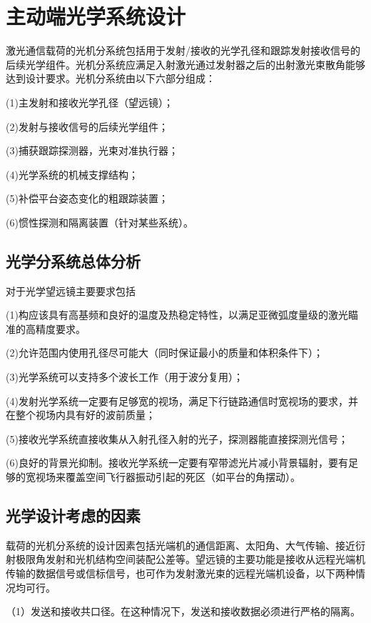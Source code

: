 \chapter{主动端光学系统设计}\label{chap:Lens Design}
激光通信载荷的光机分系统包括用于发射/接收的光学孔径和跟踪发射接收信号的后续光学组件。光机分系统应满足入射激光通过发射器之后的出射激光束散角能够达到设计要求。光机分系统由以下六部分组成：

(1)主发射和接收光学孔径（望远镜）；

(2)发射与接收信号的后续光学组件；

(3)捕获跟踪探测器，光束对准执行器；

(4)光学系统的机械支撑结构；

(5)补偿平台姿态变化的粗跟踪装置；

(6)惯性探测和隔离装置（针对某些系统）。


\section{光学分系统总体分析}
对于光学望远镜主要要求包括

(1)构应该具有高基频和良好的温度及热稳定特性，以满足亚微弧度量级的激光瞄准的高精度要求。

(2)允许范围内使用孔径尽可能大（同时保证最小的质量和体积条件下）；

(3)光学系统可以支持多个波长工作（用于波分复用）；

(4)发射光学系统一定要有足够宽的视场，满足下行链路通信时宽视场的要求，并在整个视场内具有好的波前质量；

(5)接收光学系统直接收集从入射孔径入射的光子，探测器能直接探测光信号；

(6)良好的背景光抑制。接收光学系统一定要有窄带滤光片减小背景辐射，要有足够的宽视场来覆盖空间飞行器振动引起的死区（如平台的角摆动）。
%

\section{光学设计考虑的因素}
载荷的光机分系统的设计因素包括光端机的通信距离、太阳角、大气传输、接近衍射极限角发射和光机结构空间装配公差等。望远镜的主要功能是接收从远程光端机传输的数据信号或信标信号，也可作为发射激光束的远程光端机设备，以下两种情况均可行。

（1）发送和接收共口径。在这种情况下，发送和接收数据必须进行严格的隔离。

